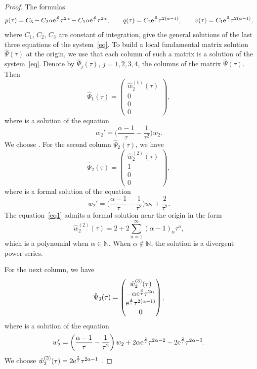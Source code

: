 \documentclass[10pt,a4paper]{amsart}
\numberwithin{equation}{section}
\begin{document}
 \begin{proof}
 The formulas
 \[
 p(\tau)=C_3 - C_2 \alpha {\rm e}^{\frac{2}{\tau}} \tau^{2 \alpha} - C_1 \alpha {\rm e}^{\frac{2}{\tau}} \tau^{2 \alpha},\qquad
 q(\tau)=C_2 {\rm e}^{\frac{2}{\tau}} \tau^{2 (\alpha-1)}, \qquad
 v(\tau)=C_1 {\rm e}^{\frac{2}{\tau}} \tau^{2 (\alpha-1)} ,
 \]
 where $C_1$, $C_2$, $C_3$ are constant of integration, give the general solutions of the last three equations of the system~\eqref{eq}.
To build a local fundamental matrix solution $\hat{\Psi}(\tau)$ at the origin, we use that each column of such a matrix is a solution
 of the system~\eqref{eq}.
 Denote by $\hat{\Psi}_j(\tau)$, $j=1, 2, 3, 4$, the columns of the matrix $\hat{\Psi}(\tau)$. Then
 \[
 \hat{\Psi}_1(\tau)=\begin{pmatrix}
 \hat{w}_2^{(1)}(\tau)\\
 0 \\
 0 \\
 0
 \end{pmatrix} ,
 \]
 where  is a solution of the equation
 \[
 w_2'=\biggl(\frac{\alpha-1}{\tau} - \frac{1}{\tau^2}\biggr) w_2 .
 \]
 We choose . For the second column $\hat{\Psi}_2(\tau)$, we have
 \[
 \hat{\Psi}_2(\tau)=\begin{pmatrix}
 \hat{w}_2^{(2)}(\tau)\\
 1 \\
 0 \\
 0
 \end{pmatrix} ,
 \]
 where  is a formal solution of the equation
 \begin{equation}
 w_2'=\biggl(\frac{\alpha-1}{\tau} - \frac{1}{\tau^2}\biggr) w_2 + \frac{2}{\tau^2} .\label{eq1}
 \end{equation}
 The equation~\eqref{eq1} admits a formal solution near the origin in the form
 \[
 \hat{w}_2^{(2)}(\tau)=2 + 2 \sum_{n=1}^{\infty} (\alpha-1)_n \tau^n,
 \]
 which is a polynomial when $\alpha\in\mathbb{N}$. When $\alpha\notin\mathbb{N}$, the solution  is a divergent power series.


 For the next column, we have
 \[
 \hat{\Psi}_3(\tau)=\begin{pmatrix}
 \hat{w}_2^{(3)}(\tau)\\[0.2ex]
 -\alpha {\rm e}^{\frac{2}{\tau}} \tau^{2 \alpha}\\[0.2ex]
 {\rm e}^{\frac{2}{\tau}} \tau^{2 (\alpha-1)}\\[0.2ex]
 0
 \end{pmatrix} ,
 \]
 where  is a solution of the equation
 \[
 w_2'=\left(\frac{\alpha-1}{\tau} - \frac{1}{\tau^2}\right) w_2 + 2 \alpha {\rm e}^{\frac{2}{\tau}} \tau^{2 \alpha-2}
 -2 {\rm e}^{\frac{2}{\tau}} \tau^{2 \alpha -3} .
 \]
 We choose
 $\hat{w}_2^{(3)}(\tau)=2 {\rm e}^{\frac{2}{\tau}} \tau^{2 \alpha -1}$ .


\end{proof}
\end{document}
